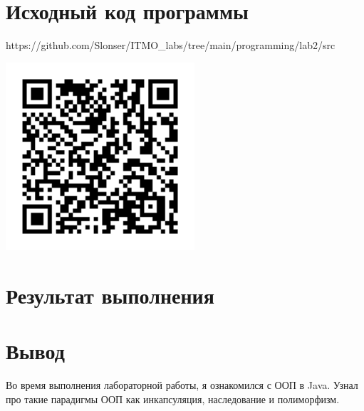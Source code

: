 \documentclass[12pt,onecolumn]{article}
\begin{document}
\newpage
\section{Исходный код программы}
https://github.com/Slonser/ITMO\_labs/tree/main/programming/lab2/src
\begin{center}
  \includegraphics[width=7cm]{img/qr-code.png}
\end{center}

\newpage
\section{Результат выполнения}

\newpage
\section{Вывод}
Во время выполнения лабораторной работы, я ознакомился с ООП в Java. Узнал про такие парадигмы ООП как инкапсуляция, наследование и полиморфизм.
\end{document}
